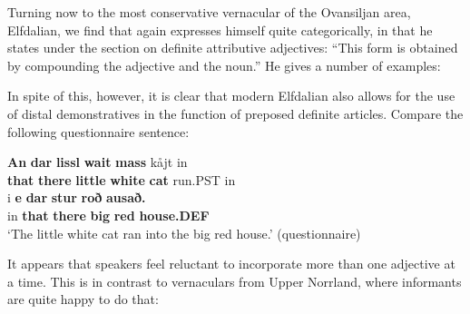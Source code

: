 
Turning now to the most conservative vernacular of the Ovansiljan area, Elfdalian, we find that \citet[53]{Levander1909} again expresses himself quite categorically, in that he states under the section on definite attributive adjectives: “This form is obtained by compounding the adjective and the noun.” He gives a number of examples:


\ea\label{}



\z 
\z 

In spite of this, however, it is clear that modern Elfdalian also allows for the use of distal demonstratives in the function of preposed definite articles. Compare the following questionnaire sentence:


\ea\label{}
\gll \textbf{An} \textbf{dar} \textbf{lissl} \textbf{wait} \textbf{mass} kåjt  in\\
\textbf{that} \textbf{there} \textbf{little} \textbf{white} \textbf{cat} run.PST  in\\
\gll i  \textbf{e}\textbf{  dar}\textbf{  stur}\textbf{  roð}\textbf{  ausað.}\\
in  \textbf{that} \textbf{there} \textbf{big} \textbf{red} \textbf{house.DEF}\\
\glt ‘The little white cat ran into the big red house.’ (questionnaire)
\z

It appears that speakers feel reluctant to incorporate more than one adjective at a time. This is in contrast to vernaculars from Upper Norrland, where informants are quite happy to do that:

